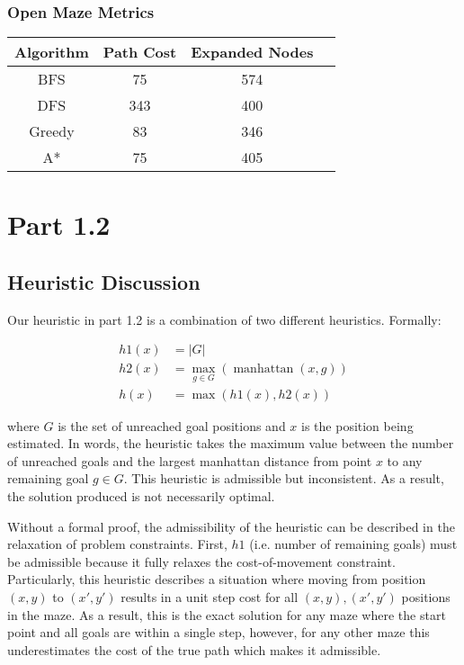 \documentclass{article}
\begin{document}
\subsubsection{Open Maze Metrics}

\begin{center}
\begin{tabular}{|c|c|c|c|}
\hline\textbf{Algorithm} & \textbf{Path Cost} & \textbf{Expanded Nodes} \\
\hline\hline BFS & 75 & 574 \\
\hline DFS & 343 & 400 \\
\hline Greedy & 83 & 346 \\
\hline A* & 75 & 405 \\
\hline
\end{tabular}
\end{center}

\section{Part 1.2}
\subsection{Heuristic Discussion}
Our heuristic in part 1.2 is a combination of two different heuristics. Formally:

\begin{align*}
h1(x) & = \lvert G \rvert \\
h2(x) & = \underset{g \in G}{\max}(\operatorname{manhattan}(x, g)) \\
h(x) & = \max(h1(x), h2(x))
\end{align*}

where $G$ is the set of unreached goal positions and $x$ is the position being estimated. In words, the heuristic takes the maximum value between the number of unreached goals and the largest manhattan distance from point $x$ to any remaining goal $g \in G$. This heuristic is admissible but inconsistent. As a result, the solution produced is not necessarily optimal.

Without a formal proof, the admissibility of the heuristic can be described in the relaxation of problem constraints. First, $h1$ (i.e. number of remaining goals) must be admissible because it fully relaxes the cost-of-movement constraint. Particularly, this heuristic describes a situation where moving from position $(x, y)$ to $(x', y')$ results in a unit step cost for all $(x, y), (x', y')$ positions in the maze. As a result, this is the exact solution for any maze where the start point and all goals are within a single step, however, for any other maze this underestimates the cost of the true path which makes it admissible.
\end{document}
